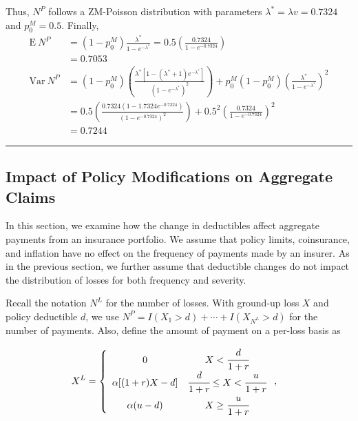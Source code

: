 \documentclass[]{book}
\theoremstyle{definition}
\theoremstyle{definition}
\theoremstyle{definition}
\theoremstyle{remark}
\begin{document}
Thus, \(N^P\) follows a ZM-Poisson distribution with parameters
\(\lambda^\ast = \lambda v= 0.7324\) and \(p_0^M = 0.5\). Finally,
\[\begin{aligned}
\mathrm{E~} N^P &= (1-p_0^M) \frac{\lambda^\ast}{1-e^{-\lambda^\ast}} = 0.5 \left( \frac{0.7324}{1-e^{-0.7324}} \right) \\
&= 0.7053 \\
\mathrm{Var~} N^P &= (1-p_0^M) \left( \frac{\lambda^\ast[1-(\lambda^\ast + 1) e^{-\lambda^\ast}]}{(1-e^{-\lambda^\ast})^2} \right) + p_0^M(1-p_0^M) \left(\frac{\lambda^\ast}{1-e^{-\lambda^\ast}} \right)^2 \\
&= 0.5 \left( \frac{0.7324(1-1.7324 e^{-0.7324})}{(1-e^{-0.7324})^2} \right) + 0.5^2 \left( \frac{0.7324}{1-e^{-0.7324}} \right)^2 \\
&= 0.7244
\end{aligned}\]

\begin{center}\rule{0.5\linewidth}{\linethickness}\end{center}

\subsection{Impact of Policy Modifications on Aggregate
Claims}\label{impact-of-policy-modifications-on-aggregate-claims}

In this section, we examine how the change in deductibles affect
aggregate payments from an insurance portfolio. We assume that policy
limits, coinsurance, and inflation have no effect on the frequency of
payments made by an insurer. As in the previous section, we further
assume that deductible changes do not impact the distribution of losses
for both frequency and severity.

Recall the notation \(N^L\) for the number of losses. With ground-up
loss \(X\) and policy deductible \(d\), we use
\(N^P = I(X_1>d) + \cdots + I(X_{N^L}>d)\) for the number of payments.
Also, define the amount of payment on a per-loss basis as

\begin{eqnarray*}
    X^{L}&=\left\{
      \begin{array}{cc}
        0 & X<\cfrac{d}{1+r} \\
        \alpha[(1+r)X-d] & \cfrac{d}{1+r}\leq X<\cfrac{u}{1+r} \\
        \alpha(u-d) &  X \ge \cfrac{u}{1+r}\\
      \end{array}
\right.,
\end{eqnarray*}
\end{document}
